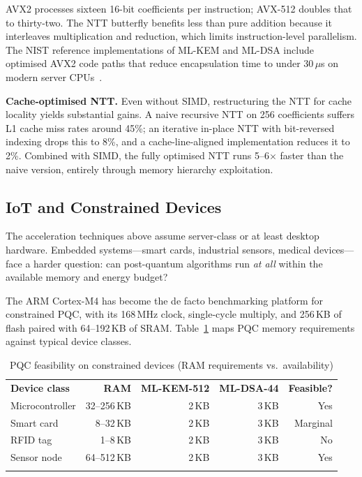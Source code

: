 AVX2 processes sixteen 16-bit coefficients per instruction; AVX-512 doubles that to thirty-two.  The NTT butterfly benefits less than pure addition because it interleaves multiplication and reduction, which limits instruction-level parallelism.  The NIST reference implementations of ML-KEM and ML-DSA include optimised AVX2 code paths that reduce encapsulation time to under 30\,$\mu$s on modern server CPUs~\cite{FIPS203, FIPS204}.

\textbf{Cache-optimised NTT.}\quad{}
Even without SIMD, restructuring the NTT for cache locality yields substantial gains.  A naive recursive NTT on 256 coefficients suffers L1 cache miss rates around 45\%; an iterative in-place NTT with bit-reversed indexing drops this to 8\%, and a cache-line-aligned implementation reduces it to 2\%.  Combined with SIMD, the fully optimised NTT runs 5--6$\times$ faster than the naive version, entirely through memory hierarchy exploitation.

\subsection{IoT and Constrained Devices}
\label{subsec:iot-feasibility}

The acceleration techniques above assume server-class or at least desktop hardware.  Embedded systems---smart cards, industrial sensors, medical devices---face a harder question: can post-quantum algorithms run \emph{at all} within the available memory and energy budget?

The ARM Cortex-M4 has become the de facto benchmarking platform for constrained PQC, with its 168\,MHz clock, single-cycle multiply, and 256\,KB of flash paired with 64--192\,KB of SRAM.  Table~\ref{tab:iot-feasibility} maps PQC memory requirements against typical device classes.

\begin{table}[t]
\caption{PQC feasibility on constrained devices (RAM requirements vs.\ availability)}
\label{tab:iot-feasibility}
\begin{tabular}{p{3cm}rrrr}
\hline\noalign{\smallskip}
\textbf{Device class} & \textbf{RAM} & \textbf{ML-KEM-512} & \textbf{ML-DSA-44} & \textbf{Feasible?} \\
\noalign{\smallskip}\svhline\noalign{\smallskip}
Microcontroller     & 32--256\,KB & 2\,KB & 3\,KB & Yes \\
Smart card          & 8--32\,KB   & 2\,KB & 3\,KB & Marginal \\
RFID tag            & 1--8\,KB    & 2\,KB & 3\,KB & No \\
Sensor node         & 64--512\,KB & 2\,KB & 3\,KB & Yes \\
\noalign{\smallskip}\hline
\end{tabular}
\end{table}


